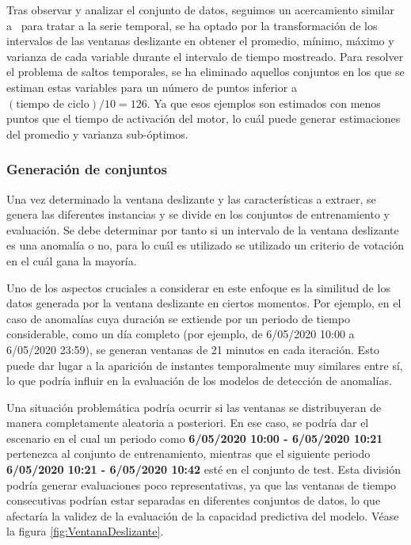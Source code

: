 \documentclass[12pt,letterpaper]{article}
\begin{document}
Tras observar y analizar el conjunto de datos, seguimos un acercamiento similar a~\cite{PredictiveMaintenance,FailureDetection} para tratar a la serie temporal, 
se ha optado por la transformación de los intervalos de las ventanas deslizante en obtener el promedio, mínimo, máximo y varianza de cada variable durante el intervalo de tiempo mostreado. 
Para resolver el problema de saltos temporales, se ha eliminado aquellos conjuntos en los que se estiman estas variables para un número de puntos inferior a $(\textrm{tiempo de ciclo}) / 10 = 126$. Ya que esos ejemplos 
son estimados con menos puntos que el tiempo de activación del motor, lo cuál puede generar estimaciones del promedio y varianza sub-óptimos.

\subsubsection{Generación de conjuntos}

Una vez determinado la ventana deslizante y las características a extraer, se genera las diferentes instancias y se divide en los conjuntos de entrenamiento y evaluación. Se debe determinar por tanto si un intervalo de la ventana deslizante es una anomalía o no, para lo cuál es utilizado se utilizado un criterio de votación en el cuál gana la mayoría.

Uno de los aspectos cruciales a considerar en este enfoque es la similitud de los datos generada por la ventana deslizante en ciertos momentos. Por ejemplo, en el caso de anomalías cuya duración se extiende por un periodo de tiempo considerable, como un día completo (por ejemplo, de 6/05/2020 10:00 a 6/05/2020 23:59), se generan ventanas de 21 minutos en cada iteración. Esto puede dar lugar a la aparición de instantes temporalmente muy similares entre sí, lo que podría influir en la evaluación de los modelos de detección de anomalías.

Una situación problemática podría ocurrir si las ventanas se distribuyeran de manera completamente aleatoria a posteriori. En ese caso, se podría dar el escenario en el cual un periodo como \textbf{6/05/2020 10:00 - 6/05/2020 10:21} pertenezca al conjunto de entrenamiento, mientras que el siguiente periodo \textbf{6/05/2020 10:21 - 6/05/2020 10:42} esté en el conjunto de test. Esta división podría generar evaluaciones poco representativas, ya que las ventanas de tiempo consecutivas podrían estar separadas en diferentes conjuntos de datos, lo que afectaría la validez de la evaluación de la capacidad predictiva del modelo. Véase la figura \ref{fig:VentanaDeslizante}.
\end{document}
